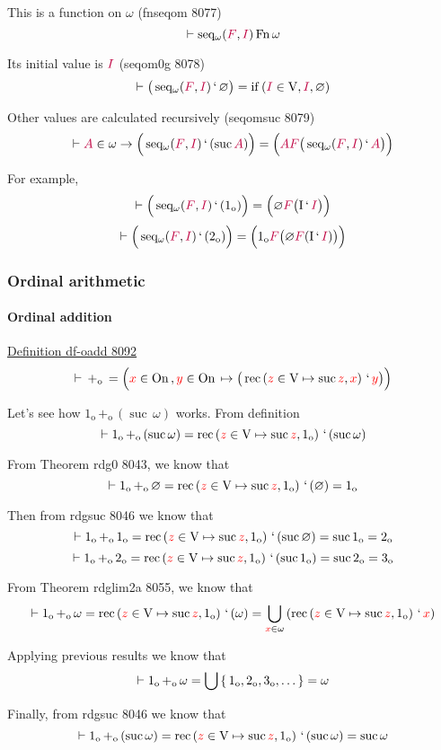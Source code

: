 \documentclass[12pt, letterpaper]{article}
\newcommand{\union}[2][]{
	\ifthenelse { \equal {#1} {} }
		{ \bigcup{#2} } %
		{ {#1}\cup{#2} } %
}
\newcommand{\iunion}[2]{\bigcup_{#1}\left({#2}\right)}
\newcommand{\red}[1]{{\color{red} #1}}
\newcommand{\purple}[1]{{\color{purple} #1}}
\renewcommand{\emptyset}{\varnothing}
\newcommand{\provable}{\vdash}
\newcommand{\ra}{\rightarrow}
\newcommand{\setvar}{\red}
\newcommand{\classvar}{\purple}
\newcommand{\sx}{\setvar{x}}
\newcommand{\sy}{\setvar{y}}
\newcommand{\sz}{\setvar{z}}
\newcommand{\clA}{\classvar{A}}
\newcommand{\clF}{\classvar{F}}
\newcommand{\clI}{\classvar{I}}
\newcommand{\VV}{\mathrm{V}}
\newcommand{\II}{\mathrm{I}}
\newcommand{\cif}[3]{\operatorname{if}\left({#1},{#2},{#3}\right)}
\newcommand{\Fn}{{\,\operatorname{Fn}\,}}
\newcommand{\at}{\,`\,}
\newcommand{\ordsuf}[1]{{#1}_{\mathrm{o}}}
\newcommand{\pluso}{\,\ordsuf{+}\,}
\newcommand{\oneo}{\ordsuf{1}}
\newcommand{\twoo}{\ordsuf{2}}
\newcommand{\threeo}{\ordsuf{3}}
\newcommand{\rec}[2]{\operatorname{rec}\left({#1},{#2}\right)}
\newcommand{\seqom}{\operatorname{seq_\omega}}
\newcommand{\suc}{{\operatorname{suc}\,}}
\newcommand{\On}{{\operatorname{On}\,}}
\theoremstyle{definition}
\theoremstyle{remark}
\theoremstyle{definition}
\theoremstyle{plain}
\begin{document}
	This is a function on $\omega$ (fnseqom 8077)
	\[\provable\seqom(\clF,\clI)\Fn\omega\]
	
	Its initial value is $\clI$ (seqom0g 8078)
	\[\provable
	\big(\seqom(\clF,\clI)\at\emptyset\big)=\cif{\clI\in\VV}{\clI}{\emptyset}
	\]
	
	Other values are calculated recursively
	(seqomsuc 8079)
	\[
	\provable
	\clA\in\omega\ra
	\Big(\seqom(\clF,\clI)\at(\suc\clA)\Big)=\Big(
	\clA\clF\big(\seqom(\clF,\clI)\at\clA\big)
	\Big)
	\]
	
	For example,
	\[\provable
	\Big(\seqom(\clF,\clI)\at(\oneo)\Big)=\Big(
	\emptyset\clF\big(\II\at\clI\big)
	\Big)
	\]
	\[\provable
	\Big(\seqom(\clF,\clI)\at(\twoo)\Big)=\Big(
	\oneo\clF\big(\emptyset\clF(\II\at\clI)\big)
	\Big)
	\]
	
	\subsubsection{Ordinal arithmetic}
	\paragraph{Ordinal addition}
	\label{par:oadd}
	\href{https://us.metamath.org/mpeuni/df-oadd.html}{Definition df-oadd 8092}
	\[\provable\pluso=
	\Big(
	\sx\in\On,\sy\in\On\mapsto
	\big(
	\rec{\sz\in\VV\mapsto\suc\sz}{\sx}\at\sy
	\big)
	\Big)
	\]
	
	Let's see how $\oneo\pluso(\suc\omega)$ works. From definition
	\[\provable\oneo\pluso(\suc\omega)=
	\rec{\sz\in\VV\mapsto\suc\sz}{\oneo}\at(\suc\omega)
	\]
	
	From Theorem rdg0 8043, we know that 
	\[\provable\oneo\pluso\emptyset=
	\rec{\sz\in\VV\mapsto\suc\sz}{\oneo}\at(
	\emptyset)=\oneo
	\]
	
	Then from rdgsuc 8046 we know that
	\[\provable\oneo\pluso\oneo=
	\rec{\sz\in\VV\mapsto\suc\sz}{\oneo}\at(
	\suc\emptyset)=\suc\oneo=\twoo
	\]
	\[\provable\oneo\pluso\twoo=
	\rec{\sz\in\VV\mapsto\suc\sz}{\oneo}\at(
	\suc\oneo)=\suc\twoo=\threeo
	\]
	
	From Theorem rdglim2a 8055, we know that
	\[
	\provable \oneo\pluso\omega=
	\rec{\sz\in\VV\mapsto\suc\sz}{\oneo}\at(
	\omega)=\iunion{\sx\in\omega}{\rec{\sz\in\VV\mapsto\suc\sz}{\oneo}\at{\sx}}
	\]
	
	Applying previous results we know that
	\[\provable \oneo\pluso\omega=\union{\set{\oneo,\twoo,\threeo,\dots}}=\omega
	\]
	
	Finally, from rdgsuc 8046 we know that
	\[\provable\oneo\pluso(
	\suc\omega)=
	\rec{\sz\in\VV\mapsto\suc\sz}{\oneo}\at(
	\suc\omega)=\suc\omega
	\]
	
\end{document}
